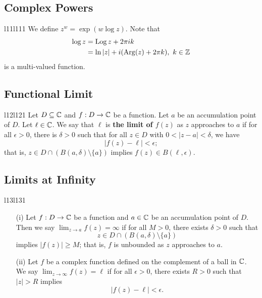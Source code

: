 \documentclass[a4paper]{article}
\begin{document}
    
\subsection*{Complex Powers}

\begin{ocg}{l11}{l11}{1}
   We define \( z^{w} = \exp(w \log z) \). Note that  
   \begin{align*}
       \log z &= \operatorname{Log} z + 2 \pi i k  \\
              &= \ln | z  |  + i (\operatorname{Arg}(z) + 2\pi k), \ k \in \mathbb{Z} 
   \end{align*}
   is a multi-valued function.
\end{ocg}
\newline
{}

\subsection*{Functional Limit}

\begin{ocg}{l12}{l12}{1}
    Let \( D \subseteq \mathbb{C}   \) and \( f: D \to \mathbb{C}  \) be a function. Let \( a \) be an accumulation point of \( D  \). Let \( \ell \in \mathbb{C}  \). We say that \( \ell  \) is \textbf{the limit of \( f(z) \)} as \( z  \) approaches to \( a  \) if for all \( \epsilon > 0 \), there is \( \delta> 0  \) such that for all \( z \in D  \) with \( 0 < |  z - a  |  < \delta \), we have
    \[  | f(z) - \ell | < \epsilon; \]
    that is, \( z \in D \cap (B(a,\delta) \setminus  \{ a \} ) \) implies \( f(z) \in B(\ell, \epsilon) \).
\end{ocg}
\newline
{}

\subsection*{Limits at Infinity}
\begin{ocg}{l13}{l13}{1}
    \begin{enumerate}
        \item[(i)] Let \( f: D \to \mathbb{C}  \) be a function and \( a \in \mathbb{C}  \) be an accumulation point of \( D  \). Then we say \( \lim_{ z \to a } f(z) = \infty   \) if for all \( M > 0  \), there exists \( \delta > 0  \) such that
            \[  z \in D \cap (B(a,\delta) \setminus  \{ a \} ) \]
            implies \( | f(z) | \geq  M \); that is, \( f  \) is unbounded as \( z  \) approaches to \( a  \).
        \item[(ii)] Let \( f  \) be a complex function defined on the complement of a ball in \( \mathbb{C}  \). We say \( \lim_{ z \to \infty  } f(z) = \ell  \) if for all \( \epsilon > 0  \), there exists \( R > 0  \) such that \( | z  |  > R  \) implies 
            \[  | f(z) - \ell  | < \epsilon. \]
    \end{enumerate}
\end{ocg}
\end{document}
